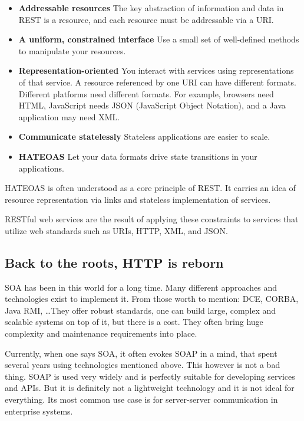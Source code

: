 	\begin{itemize}
	  	\item \textbf{Addressable resources} 
	  	The key abstraction of information and data in REST is a resource, and each resource must be addressable via a
	  	\gls{URI}.
		\item \textbf{A uniform, constrained interface}
		Use a small set of well-defined methods to manipulate your resources.
		\item \textbf{Representation-oriented}
		You interact with services using representations of that service. A resource referenced by one URI can have different
		formats. Different platforms need different formats. For example, browsers need HTML, JavaScript needs JSON (JavaScript
		Object Notation), and a Java application may need XML.
		\item \textbf{Communicate statelessly}
		Stateless applications are easier to scale.
		\item \textbf{\gls{HATEOAS}}
		Let your data formats drive state transitions in your applications.
	\end{itemize}
	
	\gls{HATEOAS} is often understood as a core principle of \gls{REST}. It carries an idea of resource representation via
	links and stateless implementation of services.
	
	RESTful web services are the result of applying these constraints to services that utilize web standards such as
	\gls{URI}s, \gls{HTTP}, \gls{XML}, and \gls{JSON}.
	
	\subsection{Back to the roots, HTTP is reborn}
	
	\gls{SOA} has been in this world for a long time. Many different approaches and technologies exist to implement it.
	From those worth to mention: DCE, CORBA, Java RMI, \ldots They offer robust standards, one can build large, complex
	and scalable systems on top of it, but there is a cost. They often bring huge complexity and maintenance requirements
	into place.
	
	Currently, when one says \gls{SOA}, it often evokes \gls{SOAP} in a mind, that spent several years using technologies
	mentioned above. This however is not a bad thing. \gls{SOAP} is used very widely and is perfectly suitable for
	developing services and \gls{API}s. But it is definitely not a lightweight technology and it is not ideal for
	everything. Its most common use case is for server-server communication in enterprise systems.
	

